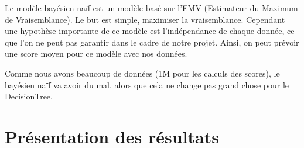 \documentclass{article}
\begin{document}
    Le modèle bayésien naïf est un modèle basé sur l'EMV
    (Estimateur du Maximum de Vraisemblance).
    Le but est simple, maximiser la vraisemblance. 
    Cependant une hypothèse importante de ce modèle est l'indépendance de chaque donnée,
    ce que l'on ne peut pas garantir dans le cadre de notre projet.
    Ainsi, on peut prévoir une score moyen pour ce modèle avec nos données.

    Comme nous avons beaucoup de données (1M pour les calculs des scores),
    le bayésien naïf va avoir du mal, alors que cela ne change pas grand
    chose pour le DecisionTree.

    \section{Présentation des résultats}
\end{document}
